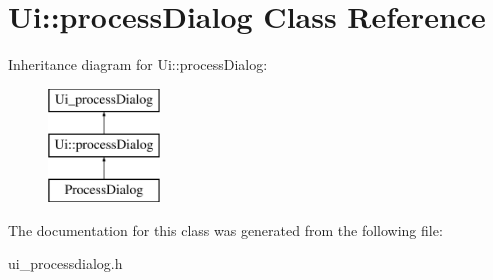 \hypertarget{class_ui_1_1process_dialog}{
\section{Ui::processDialog Class Reference}
\label{class_ui_1_1process_dialog}
}
Inheritance diagram for Ui::processDialog:\begin{figure}[H]
\begin{center}
\leavevmode
\includegraphics[height=3.000000cm]{class_ui_1_1process_dialog}
\end{center}
\end{figure}


The documentation for this class was generated from the following file:\begin{DoxyCompactItemize}
\item 
ui\_\-processdialog.h\end{DoxyCompactItemize}
